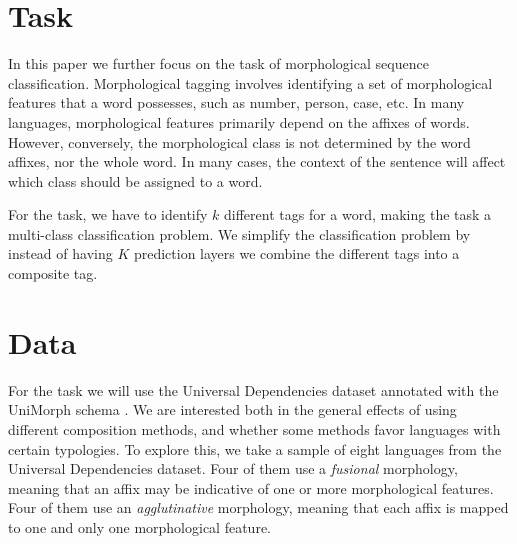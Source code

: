 \documentclass[11pt]{article}
\begin{document}
    

    \section{Task}
             In this paper we further focus on the task of
     morphological sequence classification. Morphological tagging
     involves identifying a set of morphological features that a word
     possesses, such as number, person, case, etc. In many languages,
     morphological features primarily depend on the affixes of
     words. However, conversely, the morphological class is not
     determined by the word affixes, nor the whole word. In many
     cases, the context of the sentence will affect which class should
     be assigned to a word.

         For the task, we have to identify $k$ different tags for a
     word, making the task a multi-class classification problem. We
     simplify the classification problem by instead of having $K$
     prediction layers we combine the different tags into a composite
     tag.

    \section{Data}
    
        For the task we will use the Universal Dependencies dataset
     \cite{nivre2018} annotated with the UniMorph schema
     \cite{mccarthy2018marrying}. We are interested both in the
     general effects of using different composition methods, and
     whether some methods favor languages with certain typologies. To
     explore this, we take a sample of eight languages from the
     Universal Dependencies dataset. Four of them use a
     \textit{fusional} morphology, meaning that an affix may be
     indicative of one or more morphological features. Four of them
     use an \textit{agglutinative} morphology, meaning that each affix
     is mapped to one and only one morphological feature.
\end{document}
